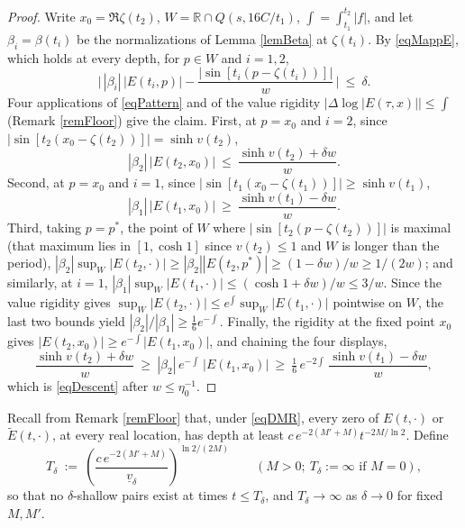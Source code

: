 \documentclass[11pt,twoside,reqno]{amsart}
\def\ti{\tilde}
\def\to{\rightarrow}
\def\R{{\mathbb R}}
\def\d{\delta}
\def\b{\beta}
\def\uv{\underline{v}_{\d}}
\theoremstyle{plain}
\numberwithin{equation}{section}
\begin{document}
\begin{proof}
Write $x_0=\Re\zeta(t_2)$, $W=\R\cap Q(s,16C/t_1)$, $\int=\int_{t_1}^{t_2}|f|$, and let $\b_i=\b(t_i)$ be the normalizations of Lemma \ref{lemBeta} at $\zeta(t_i)$. By \eqref{eqMappE}, which holds at every depth, for $p\in W$ and $i=1,2$,
\begin{equation}
\Big|\,|\b_i|\,|E(t_i,p)|-\frac{\left|\sin[t_i(p-\zeta(t_i))]\right|}{w}\,\Big|\ \leq\ \d .
\label{eqPattern}
\end{equation}
Four applications of \eqref{eqPattern} and of the value rigidity $|\Delta\log|E(\tau,x)||\leq\int$ (Remark \ref{remFloor}) give the claim. First, at $p=x_0$ and $i=2$, since $|\sin[t_2(x_0-\zeta(t_2))]|=\sinh v(t_2)$,
$$|\b_2|\,|E(t_2,x_0)|\ \leq\ \frac{\sinh v(t_2)+\d w}{w}.$$
Second, at $p=x_0$ and $i=1$, since $|\sin[t_1(x_0-\zeta(t_1))]|\geq\sinh v(t_1)$,
$$|\b_1|\,|E(t_1,x_0)|\ \geq\ \frac{\sinh v(t_1)-\d w}{w}.$$
Third, taking $p=p^*$, the point of $W$ where $|\sin[t_2(p-\zeta(t_2))]|$ is maximal (that maximum lies in $[1,\cosh1]$ since $v(t_2)\leq1$ and $W$ is longer than the period), $|\b_2|\sup_W|E(t_2,\cdot)|\geq|\b_2||E(t_2,p^*)|\geq(1-\d w)/w\geq1/(2w)$; and similarly, at $i=1$, $|\b_1|\sup_W|E(t_1,\cdot)|\leq(\cosh 1+\d w)/w\leq3/w$. Since the value rigidity gives $\sup_W|E(t_2,\cdot)|\leq e^{\int}\sup_W|E(t_1,\cdot)|$ pointwise on $W$, the last two bounds yield $|\b_2|/|\b_1|\geq\tfrac16e^{-\int}$. Finally, the rigidity at the fixed point $x_0$ gives $|E(t_2,x_0)|\geq e^{-\int}|E(t_1,x_0)|$, and chaining the four displays,
$$\frac{\sinh v(t_2)+\d w}{w}\ \geq\ |\b_2|\,e^{-\int}\,|E(t_1,x_0)|\ \geq\ \tfrac16\,e^{-2\int}\,\frac{\sinh v(t_1)-\d w}{w},$$
which is \eqref{eqDescent} after $w\leq\eta_0^{-1}$.
\end{proof}

Recall from Remark \ref{remFloor} that, under \eqref{eqDMR}, every zero of $E(t,\cdot)$ or $\ti E(t,\cdot)$, at every real location, has depth at least $c\,e^{-2(M'+M)}t^{-2M/\ln2}$. Define
\begin{equation}
T_\d\ :=\ \left(\frac{c\,e^{-2(M'+M)}}{\uv}\right)^{\ln2/(2M)}\qquad(M>0;\ T_\d:=\infty\text{ if }M=0),
\label{eqTdelta}
\end{equation}
so that no $\d$-shallow pairs exist at times $t\leq T_\d$, and $T_\d\to\infty$ as $\d\to0$ for fixed $M,M'$.
\end{document}
